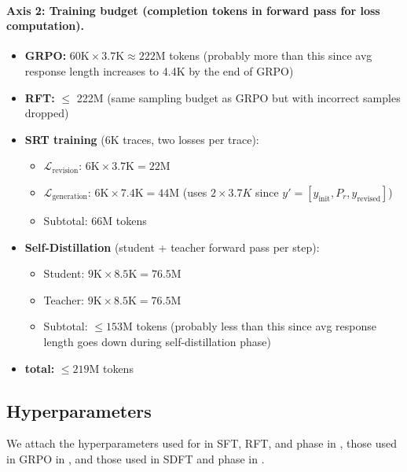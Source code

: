 \paragraph{Axis 2: Training budget (completion tokens in forward pass for loss computation).}
\begin{itemize}
    \item \textbf{GRPO:} $60\text{K} \times 3.7\text{K} \approx 222\text{M}$ tokens (probably more than this since avg response length increases to 4.4K by the end of GRPO)
    \item \textbf{RFT:} $\leq$ 222M (same sampling budget as GRPO but with incorrect samples dropped)
    \item \textbf{\ours{} SRT training} (6K traces, two losses per trace):
    \begin{itemize}
        \item $\mathcal{L}_{\text{revision}}$: $6\text{K} \times 3.7\text{K} = 22\text{M}$
        \item $\mathcal{L}_{\text{generation}}$: $6\text{K} \times 7.4\text{K} = 44\text{M}$ (uses $2 \times 3.7K$ since $y' = [y_{\text{init}}, P_r, y_{\text{revised}}]$)
        \item Subtotal: $66\text{M}$ tokens
    \end{itemize}
    \item \textbf{\ours{} Self-Distillation} (student + teacher forward pass per step):
    \begin{itemize}
        \item Student: $9\text{K} \times 8.5\text{K} = 76.5\text{M}$
        \item Teacher: $9\text{K} \times 8.5\text{K} = 76.5\text{M}$
        \item Subtotal: $\leq 153\text{M}$ tokens (probably less than this since avg response length goes down during self-distillation phase)
    \end{itemize}
    \item \textbf{\ours{} total:} $\leq 219\text{M}$ tokens
\end{itemize}


\subsection{Hyperparameters} \label{app:hyperparameters}
We attach the hyperparameters used for \qwen{} in SFT, RFT, and \ours{} \sft{} phase in , those used in GRPO in , and those used in SDFT and \ours{} \opsd{} phase in .



